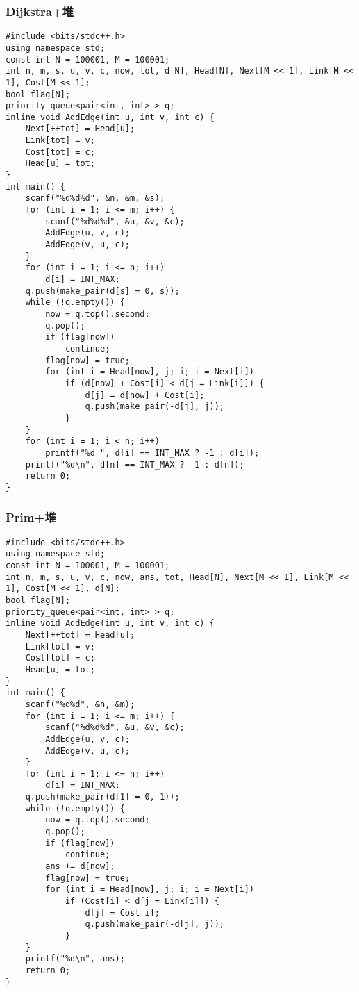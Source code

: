 \documentclass[a4paper]{article}
\begin{document}
\subsubsection{Dijkstra+堆}
\begin{lstlisting}
#include <bits/stdc++.h>
using namespace std;
const int N = 100001, M = 100001;
int n, m, s, u, v, c, now, tot, d[N], Head[N], Next[M << 1], Link[M << 1], Cost[M << 1];
bool flag[N];
priority_queue<pair<int, int> > q;
inline void AddEdge(int u, int v, int c) {
    Next[++tot] = Head[u];
    Link[tot] = v;
    Cost[tot] = c;
    Head[u] = tot;
}
int main() {
    scanf("%d%d%d", &n, &m, &s);
    for (int i = 1; i <= m; i++) {
        scanf("%d%d%d", &u, &v, &c);
        AddEdge(u, v, c);
        AddEdge(v, u, c);
    }
    for (int i = 1; i <= n; i++)
        d[i] = INT_MAX;
    q.push(make_pair(d[s] = 0, s));
    while (!q.empty()) {
        now = q.top().second;
        q.pop();
        if (flag[now])
            continue;
        flag[now] = true;
        for (int i = Head[now], j; i; i = Next[i])
            if (d[now] + Cost[i] < d[j = Link[i]]) {
                d[j] = d[now] + Cost[i];
                q.push(make_pair(-d[j], j));
            }
    }
    for (int i = 1; i < n; i++)
        printf("%d ", d[i] == INT_MAX ? -1 : d[i]);
    printf("%d\n", d[n] == INT_MAX ? -1 : d[n]);
    return 0;
}
\end{lstlisting}
\subsubsection{Prim+堆}
\begin{lstlisting}
#include <bits/stdc++.h>
using namespace std;
const int N = 100001, M = 100001;
int n, m, s, u, v, c, now, ans, tot, Head[N], Next[M << 1], Link[M << 1], Cost[M << 1], d[N];
bool flag[N];
priority_queue<pair<int, int> > q;
inline void AddEdge(int u, int v, int c) {
    Next[++tot] = Head[u];
    Link[tot] = v;
    Cost[tot] = c;
    Head[u] = tot;
}
int main() {
    scanf("%d%d", &n, &m);
    for (int i = 1; i <= m; i++) {
        scanf("%d%d%d", &u, &v, &c);
        AddEdge(u, v, c);
        AddEdge(v, u, c);
    }
    for (int i = 1; i <= n; i++)
        d[i] = INT_MAX;
    q.push(make_pair(d[1] = 0, 1));
    while (!q.empty()) {
        now = q.top().second;
        q.pop();
        if (flag[now])
            continue;
        ans += d[now];
        flag[now] = true;
        for (int i = Head[now], j; i; i = Next[i])
            if (Cost[i] < d[j = Link[i]]) {
                d[j] = Cost[i];
                q.push(make_pair(-d[j], j));
            }
    }
    printf("%d\n", ans);
    return 0;
}
\end{lstlisting}
\end{document}
